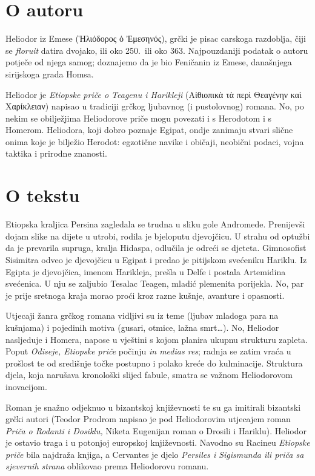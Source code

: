 \section*{O autoru}

Heliodor iz Emese \textgreek[variant=ancient]{(Ἡλιόδορος ὁ Ἐμεσηνός),} grčki je pisac carskoga razdoblja, čiji se \textit{floruit} datira dvojako, ili oko 250.\ ili oko 363. Najpouzdaniji podatak o autoru potječe od njega samog; doznajemo da je bio Feničanin iz Emese, današnjega sirijskoga grada Homsa.

Heliodor je \textit{Etiopske priče o Teagenu i Harikleji} \textgreek[variant=ancient]{(Αἰθιοπικὰ τὰ περὶ Θεαγένην καὶ Χαρίκλειαν)} napisao u tradiciji grčkog ljubavnog (i pustolovnog) romana. No, po nekim se obilježjima Heliodorove priče mogu povezati i s Herodotom i s Homerom. Heliodora, koji dobro poznaje Egipat, ondje zanimaju stvari slične onima koje je bilježio Herodot: egzotične navike i običaji, neobični podaci, vojna taktika i prirodne znanosti.


\section*{O tekstu}

Etiopska kraljica Persina zagledala se trudna u sliku gole Andromede. Prenijevši dojam slike na dijete u utrobi, rodila je bjeloputu djevojčicu. U strahu od optužbi da je prevarila supruga, kralja Hidaspa, odlučila je odreći se djeteta. Gimnosofist Sisimitra odveo je djevojčicu u Egipat i predao je pitijskom svećeniku Hariklu. Iz Egipta je djevojčica, imenom Harikleja, prešla u Delfe i postala Artemidina svećenica. U nju se zaljubio Tesalac Teagen, mladić plemenita porijekla. No, par je prije sretnoga kraja morao proći kroz razne kušnje, avanture i opasnosti.

Utjecaji žanra grčkog romana vidljivi su iz teme (ljubav mladoga para na kušnjama) i pojedinih motiva (gusari, otmice, lažna smrt\dots). No, Heliodor nasljeduje i Homera, napose u vještini s kojom planira ukupnu strukturu zapleta. Poput \textit{Odiseje, Etiopske priče} počinju \textit{in medias res}; radnja se zatim vraća u prošlost te od središnje točke postupno i polako kreće do kulminacije. Struktura djela, koja narušava kronološki slijed fabule, smatra se važnom Heliodorovom inovacijom. 

Roman je snažno odjeknuo u bizantskoj književnosti te su ga imitirali bizantski grčki autori (Teodor Prodrom napisao je pod Heliodorovim utjecajem roman \textit{Priča o Rodanti i Dosiklu,} Niketa Eugenijan roman o Drosili i Hariklu). Heliodor je ostavio traga i u potonjoj europskoj književnosti. Navodno su Racineu \textit{Etiopske priče} bila najdraža knjiga, a Cervantes je djelo \textit{Persiles i Sigismunda ili priča sa sjevernih strana} oblikovao prema Heliodorovu romanu.

